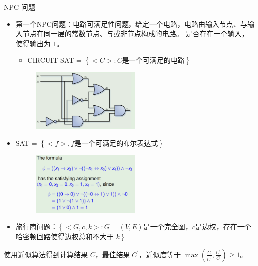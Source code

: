 \begin{remark}
    NPC 问题\begin{itemize}
        \item 第一个NPC问题：电路可满足性问题，给定一个电路，电路由输入节点、与输入节点在同一层的常数节点、与或非节点构成的电路。 是否存在一个输入，使得输出为 $1$。\begin{itemize}
            \item CIRCUIT-SAT = $\left\{<C>:C\text{是一个可满足的电路}\right\}$
        \end{itemize}
        \begin{figure}[htbp]
            \centering
            \includegraphics[width=0.5\textwidth]{./figure/fig3.png}
        \end{figure}
        \item SAT = $\left\{<f>, f\text{是一个可满足的布尔表达式}\right\}$
        \begin{figure}[htbp]
            \centering
            \includegraphics[width=0.5\textwidth]{./figure/fig4.png}
        \end{figure}
        \item 旅行商问题：$\left\{<G, c, k>: G=(V, E)\text{是一个完全图，}c\text{是边权}\right.$，存在一个哈密顿回路使得边权总和不大于 $k\left.\right\}$
    \end{itemize}
\end{remark}

\begin{remark}
    使用近似算法得到计算结果 $C$，最佳结果 $C^\prime$，近似度等于 $\max(\frac{C}{C^\prime}, \frac{C^\prime}{C}) \ge 1$。
\end{remark}


